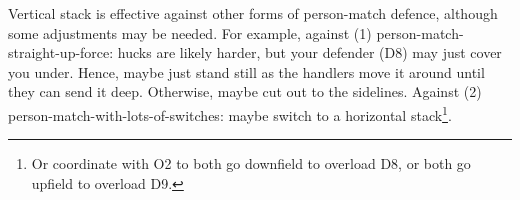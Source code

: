 \documentclass{tufte-handout}
\begin{document}
Vertical stack is effective
 against other forms of person-match defence, 
although some adjustments may be needed. 
For example, 
against (1) person-match-straight-up-force: 
hucks are likely harder, 
but your defender (D8) 
may just cover you under. 
Hence, maybe just
stand still as the handlers 
move it around until
they can send it deep.
Otherwise, 
maybe cut out to the sidelines.
Against (2) person-match-with-lots-of-switches: 
maybe switch
 to a horizontal stack\footnote{
Or coordinate 
with O2 to both
go downfield 
to overload D8, 
or both go upfield to overload D9.}.
\end{document}

